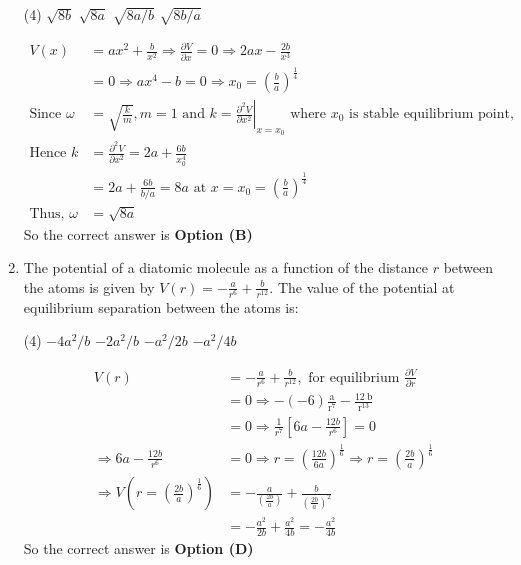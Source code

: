 \begin{enumerate}
\begin{tasks}(4)
\task[\textbf{A.}] $\sqrt{8 b}$
\task[\textbf{B.}] $\sqrt{8 a}$
\task[\textbf{C.}] $\sqrt{8 a / b}$
\task[\textbf{D.}] $\sqrt{8 b / a}$
\end{tasks}
\begin{answer}
\begin{align*}
V(x)&=a x^{2}+\frac{b}{x^{2}} \Rightarrow \frac{\partial V}{\partial x}=0 \Rightarrow 2 a x-\frac{2 b}{x^{3}}\\&=0 \Rightarrow a x^{4}-b=0 \Rightarrow x_{0}=\left(\frac{b}{a}\right)^{\frac{1}{4}}\\
\text{Since }\omega&=\sqrt{\frac{k}{m}}, m=1\text{ and }k=\left.\frac{\partial^{2} V}{\partial x^{2}}\right|_{x=x_{0}}\text{ where }x_{0} \text{ is stable equilibrium point,}\\
\text{Hence }k&=\frac{\partial^{2} V}{\partial x^{2}}=2 a+\frac{6 b}{x_{0}^{4}}\\&=2 a+\frac{6 b}{b / a}=8 a\text{ at }x=x_{0}=\left(\frac{b}{a}\right)^{\frac{1}{4}}\\
\text{Thus, }\omega&=\sqrt{8 a}
\end{align*}
So the correct answer is \textbf{Option (B)}
\end{answer}
\item The potential of a diatomic molecule as a function of the distance $r$ between the atoms is given by $V(r)=-\frac{a}{r^{6}}+\frac{b}{r^{12}} .$ The value of the potential at equilibrium separation between the atoms is:

\begin{tasks}(4)
\task[\textbf{A.}] $-4 a^{2} / b$
\task[\textbf{B.}] $-2 a^{2} / b$
\task[\textbf{C.}] $-a^{2} / 2 b$
\task[\textbf{D.}] $-a^{2} / 4 b$
\end{tasks}
\begin{answer}
\begin{align*}
V(r)&=-\frac{a}{r^{6}}+\frac{b}{r^{12}},\text{ for equilibrium }\frac{\partial V}{\partial r}\\&=0 \Rightarrow-(-6) \frac{\mathrm{a}}{\mathrm{r}^{7}}-\frac{12 \mathrm{~b}}{\mathrm{r}^{13}}\\&=0 \Rightarrow \frac{1}{r^{7}}\left[6 a-\frac{12 b}{r^{6}}\right]=0\\
\Rightarrow 6 a-\frac{12 b}{r^{6}}&=0 \Rightarrow r=\left(\frac{12 b}{6 a}\right)^{\frac{1}{6}} \Rightarrow r=\left(\frac{2 b}{a}\right)^{\frac{1}{6}}\\
\Rightarrow V\left(r=\left(\frac{2 b}{a}\right)^{\frac{1}{6}}\right)&=-\frac{a}{\left(\frac{2 b}{a}\right)}+\frac{b}{\left(\frac{2 b}{a}\right)^{2}}\\&=-\frac{a^{2}}{2 b}+\frac{a^{2}}{4 b}=-\frac{a^{2}}{4 b}
\end{align*}
So the correct answer is \textbf{Option (D)}
\end{answer}


\end{enumerate}

